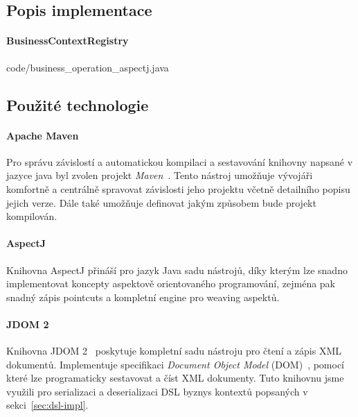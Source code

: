 \subsection{Popis implementace}

\paragraph{BusinessContextRegistry}


{code/business_operation_aspectj.java}

\subsection{Použité technologie}

\paragraph{Apache Maven}

Pro správu závislostí a automatickou kompilaci a sestavování
knihovny napsané v jazyce java byl zvolen projekt \textit{Maven}~\cite{maven}.
Tento nástroj umožňuje vývojáři komfortně a centrálně
spravovat závislosti jeho projektu včetně detailního
popisu jejich verze. Dále také umožňuje definovat jakým
způsobem bude projekt kompilován.

\paragraph{AspectJ}

Knihovna AspectJ přináší pro jazyk Java sadu nástrojů,
díky kterým lze snadno implementovat koncepty aspektově orientovaného
programování, zejména pak snadný zápis pointcuts a kompletní
engine pro weaving aspektů.


\paragraph{JDOM 2}

Knihovna JDOM 2~\cite{jdom2} poskytuje
kompletní sadu nástroju pro čtení a zápis \gls{XML} dokumentů.
Implementuje specifikaci \textit{Document Object Model} (\gls{DOM})~\cite{wood2004document},
pomocí které lze programaticky sestavovat a číst \gls{XML} dokumenty.
Tuto knihovnu jsme využili pro serializaci a deserializaci
\gls{DSL} byznys kontextů popsaných v sekci~\ref{sec:dsl-impl}.

